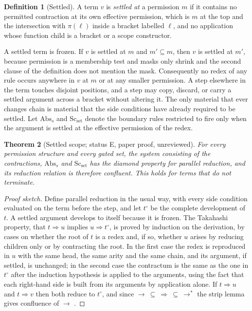 \documentclass[11pt]{article}
\newtheorem{theorem}{Theorem}[section]
\theoremstyle{definition}
\newtheorem{definition}[theorem]{Definition}
\theoremstyle{remark}
\newcommand{\Et}{status E}
\begin{document}
\begin{definition}[Settled]\label{def:settled}
A term $v$ is \emph{settled at} a permission $m$ if it contains no permitted contraction at its own effective permission, which is $m$ at the top and the intersection with $\pi(\ell)$ inside a bracket labelled $\ell$, and no application whose function child is a bracket or a scope constructor.
\end{definition}

A settled term is frozen. If $v$ is settled at $m$ and $m'\subseteq m$, then $v$ is settled at $m'$, because permission is a membership test and masks only shrink and the second clause of the definition does not mention the mask. Consequently no redex of any rule occurs anywhere in $v$ at $m$ or at any smaller permission. A step elsewhere in the term touches disjoint positions, and a step may copy, discard, or carry a settled argument across a bracket without altering it. The only material that ever changes chain is material that the side conditions have already required to be settled. Let $\mathrm{Abs}_s$ and $\mathrm{Sc}_{\mathrm{set}}$ denote the boundary rules restricted to fire only when the argument is settled at the effective permission of the redex.

\begin{theorem}[Settled scope; \Et, paper proof, unreviewed]\label{thm:settled}
For every permission structure and every gated set, the system consisting of the contractions, $\mathrm{Abs}_s$ and $\mathrm{Sc}_{\mathrm{set}}$ has the diamond property for parallel reduction, and its reduction relation is therefore confluent. This holds for terms that do not terminate.
\end{theorem}

\begin{proof}[Proof sketch]
Define parallel reduction in the usual way, with every side condition evaluated on the term before the step, and let $t^{\circ}$ be the complete development of $t$. A settled argument develops to itself because it is frozen. The Takahashi property, that $t\Rightarrow u$ implies $u\Rightarrow t^{\circ}$, is proved by induction on the derivation, by cases on whether the root of $t$ is a redex and, if so, whether $u$ arises by reducing children only or by contracting the root. In the first case the redex is reproduced in $u$ with the same head, the same arity and the same chain, and its argument, if settled, is unchanged; in the second case the contractum is the same as the one in $t^{\circ}$ after the induction hypothesis is applied to the arguments, using the fact that each right-hand side is built from its arguments by application alone. If $t\Rightarrow u$ and $t\Rightarrow v$ then both reduce to $t^{\circ}$, and since $\to\ \subseteq\ \Rightarrow\ \subseteq\ \to^{*}$ the strip lemma gives confluence of $\to$ \citep{takahashi1995}.
\end{proof}
\end{document}
